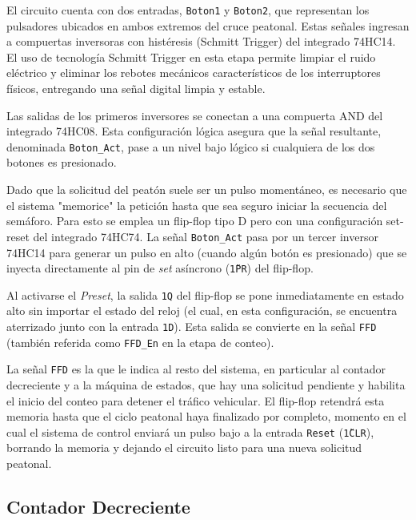 \documentclass[journal, onecolumn]{IEEEtran}
\begin{document}
El circuito cuenta con dos entradas, \texttt{Boton1} y \texttt{Boton2}, que representan los pulsadores ubicados en ambos extremos del cruce peatonal. Estas señales ingresan a compuertas inversoras con histéresis (Schmitt Trigger) del integrado 74HC14. El uso de tecnología Schmitt Trigger en esta etapa permite limpiar el ruido eléctrico y eliminar los rebotes mecánicos característicos de los interruptores físicos, entregando una señal digital limpia y estable.

Las salidas de los primeros inversores se conectan a una compuerta AND del integrado 74HC08. Esta configuración lógica asegura que la señal resultante, denominada \texttt{Boton\_Act}, pase a un nivel bajo lógico si cualquiera de los dos botones es presionado. 

Dado que la solicitud del peatón suele ser un pulso momentáneo, es necesario que el sistema "memorice" la petición hasta que sea seguro iniciar la secuencia del semáforo. Para esto se emplea un flip-flop tipo D pero con una configuración set-reset del integrado 74HC74. La señal \texttt{Boton\_Act} pasa por un tercer inversor 74HC14 para generar un pulso en alto (cuando algún botón es presionado) que se inyecta directamente al pin de \textit{set} asíncrono (\texttt{\~1PR}) del flip-flop. 

Al activarse el \textit{Preset}, la salida \texttt{1Q} del flip-flop se pone inmediatamente en estado alto sin importar el estado del reloj (el cual, en esta configuración, se encuentra aterrizado junto con la entrada \texttt{1D}). Esta salida se convierte en la señal \texttt{FFD} (también referida como \texttt{FFD\_En} en la etapa de conteo). 

La señal \texttt{FFD} es la que le indica al resto del sistema, en particular al contador decreciente y a la máquina de estados, que hay una solicitud pendiente y habilita el inicio del conteo para detener el tráfico vehicular. El flip-flop retendrá esta memoria hasta que el ciclo peatonal haya finalizado por completo, momento en el cual el sistema de control enviará un pulso bajo a la entrada \texttt{Reset} (\texttt{\~1CLR}), borrando la memoria y dejando el circuito listo para una nueva solicitud peatonal.

\subsection{Contador Decreciente}
\end{document}
